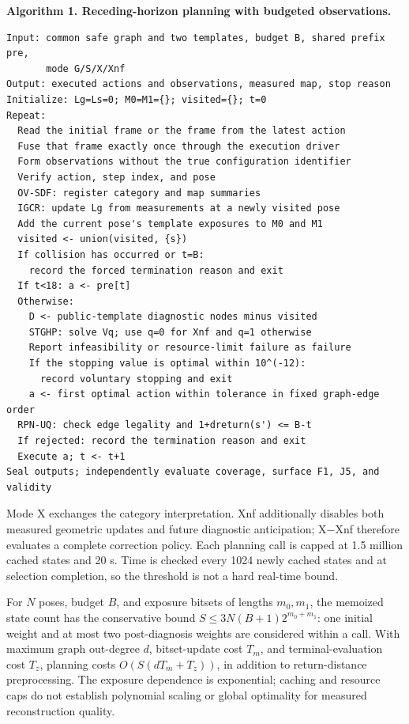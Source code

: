 \documentclass[11pt,a4paper]{article}
\begin{document}
\par\noindent\begin{minipage}{\linewidth}
\small
\textbf{Algorithm 1. Receding-horizon planning with budgeted observations.}

\begin{verbatim}
Input: common safe graph and two templates, budget B, shared prefix pre,
       mode G/S/X/Xnf
Output: executed actions and observations, measured map, stop reason
Initialize: Lg=Ls=0; M0=M1={}; visited={}; t=0
Repeat:
  Read the initial frame or the frame from the latest action
  Fuse that frame exactly once through the execution driver
  Form observations without the true configuration identifier
  Verify action, step index, and pose
  OV-SDF: register category and map summaries
  IGCR: update Lg from measurements at a newly visited pose
  Add the current pose's template exposures to M0 and M1
  visited <- union(visited, {s})
  If collision has occurred or t=B:
    record the forced termination reason and exit
  If t<18: a <- pre[t]
  Otherwise:
    D <- public-template diagnostic nodes minus visited
    STGHP: solve Vq; use q=0 for Xnf and q=1 otherwise
    Report infeasibility or resource-limit failure as failure
    If the stopping value is optimal within 10^(-12):
      record voluntary stopping and exit
    a <- first optimal action within tolerance in fixed graph-edge order
  RPN-UQ: check edge legality and 1+dreturn(s') <= B-t
  If rejected: record the termination reason and exit
  Execute a; t <- t+1
Seal outputs; independently evaluate coverage, surface F1, J5, and validity
\end{verbatim}
\end{minipage}


Mode X exchanges the category interpretation. Xnf additionally disables both measured geometric updates and future diagnostic anticipation; X−Xnf therefore evaluates a complete correction policy. Each planning call is capped at 1.5 million cached states and 20 s. Time is checked every 1024 newly cached states and at selection completion, so the threshold is not a hard real-time bound.

For \(N\) poses, budget \(B\), and exposure bitsets of lengths \(m_0,m_1\), the memoized state count has the conservative bound \(S\le3N(B+1)2^{m_0+m_1}\): one initial weight and at most two post-diagnosis weights are considered within a call. With maximum graph out-degree \(d\), bitset-update cost \(T_m\), and terminal-evaluation cost \(T_z\), planning costs \(O(S(dT_m+T_z))\), in addition to return-distance preprocessing. The exposure dependence is exponential; caching and resource caps do not establish polynomial scaling or global optimality for measured reconstruction quality.
\end{document}
